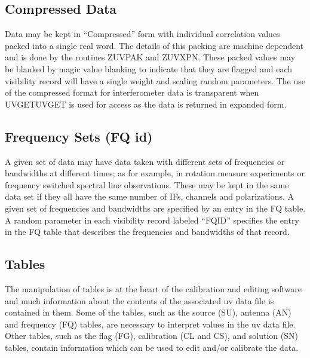 \subsection{Compressed Data}

   Data may be kept in ``Compressed'' form with individual correlation
values packed into a single real word.  The details of this packing
are machine dependent and is done by the routines ZUVPAK
and ZUVXPN.  These packed values may be blanked by magic
value blanking to indicate that they are flagged and each visibility
record will have a single weight and scaling random parameters.  The
use of the compressed format for interferometer data is transparent
when UVGET{\index UVGET} is used for access as the data is returned in expanded
form.

\subsection{Frequency Sets (FQ id)}

   A given set of data may have data taken with different sets of
frequencies or bandwidths at different times; as for example, in
rotation measure experiments or frequency switched spectral line
observations.  These may be kept in the same data set if they all have
the same number of IFs, channels and polarizations.  A given set of
frequencies and bandwidths are specified by an entry in the FQ table.
A random parameter in each visibility record labeled ``FQID''
specifies the entry in the FQ table that describes the frequencies and
bandwidths of that record.

\subsection{Tables }
The manipulation of tables is at the heart of the calibration and
editing software and much information about the contents of the
associated uv data file is contained in them.  Some of the tables,
such as the source (SU), antenna (AN) and frequency (FQ) tables, are
necessary to interpret values in the uv data file.  Other tables, such
as the flag (FG), calibration (CL and CS), and solution (SN) tables,
contain information which can be used to edit and/or calibrate the
data.

